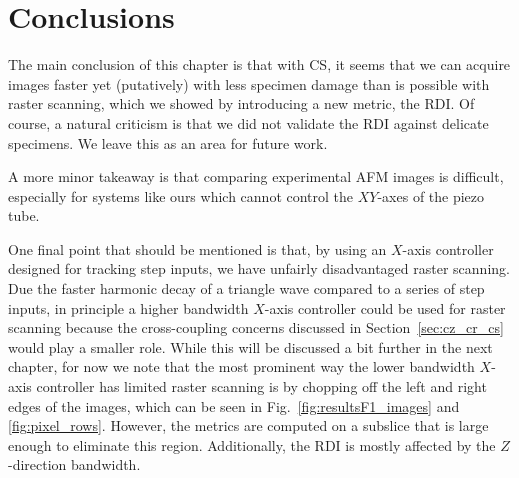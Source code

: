 \documentclass[twocolumn,twoside]{IEEEtran/IEEEtran}
\begin{document}
\section{Conclusions}
The main conclusion of this chapter is that with CS, it seems that we can
acquire images faster yet (putatively) with less specimen damage than is
possible with raster scanning, which we showed by introducing a new metric, the
RDI. Of course, a natural criticism is that we did not validate the RDI against
delicate specimens. We leave this as an area for future work.

A more minor takeaway is that comparing experimental AFM images is difficult,
especially for systems like ours which cannot control the $XY$-axes of the piezo
tube.

One final point that should be mentioned is that, by using an $X$-axis
controller designed for tracking step inputs, we have unfairly disadvantaged
raster scanning. Due the faster harmonic decay of a triangle wave compared to a
series of step inputs, in principle a higher bandwidth $X$-axis controller could
be used for raster scanning because the cross-coupling concerns discussed in
Section~\ref{sec:cz_cr_cs} would play a smaller role. While this will be
discussed a bit further in the next chapter, for now we note that the most
prominent way the lower bandwidth $X$-axis controller has limited raster
scanning is by chopping off the left and right edges of the images, which can be
seen in Fig.~\ref{fig:resultsF1_images} and \ref{fig:pixel_rows}. However, the
metrics are computed on a subslice that is large enough to eliminate this
region. Additionally, the RDI is mostly affected by the $Z$-direction bandwidth.
    



\end{document}
